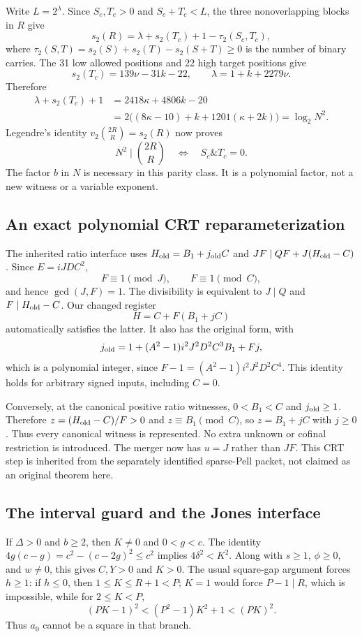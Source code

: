 Write $L=2^\lambda$. Since $S_c,T_c>0$ and $S_c+T_c<L$, the three
nonoverlapping blocks in $R$ give
\[
 s_2(R)=\lambda+s_2(T_c)+1-\tau_2(S_c,T_c),
\]
where $\tau_2(S,T)=s_2(S)+s_2(T)-s_2(S+T)\ge0$ is the number of binary
carries. The 31 low allowed positions and 22 high target positions give
\[
 s_2(T_c)=139\nu-31k-22,\qquad\lambda=1+k+2279\nu.
\]
Therefore
\begin{align*}
 \lambda+s_2(T_c)+1
 &=2418\kappa+4806k-20\\
 &=2\bigl((8\kappa-10)+k+1201(\kappa+2k)\bigr)=\log_2N^2.
\end{align*}
Legendre's identity $v_2\binom{2R}{R}=s_2(R)$ now proves
\[
 N^2\mid\binom{2R}{R}\quad\Longleftrightarrow\quad
 S_c\mathbin{\&}T_c=0.
\]
The factor $b$ in $N$ is necessary in this parity class. It is a polynomial
factor, not a new witness or a variable exponent.

\subsection{An exact polynomial CRT reparameterization}
The inherited ratio interface uses $H_{\rm old}=B_1+j_{\rm old}C$ and
$JF\mid QF+J(H_{\rm old}-C)$. Since $E=iJDC^2$,
\[
 F\equiv1\pmod J,\qquad F\equiv1\pmod C,
\]
and hence $\gcd(J,F)=1$. The divisibility is equivalent to
$J\mid Q$ and $F\mid H_{\rm old}-C$. Our changed register
\[
 H=C+F(B_1+jC)
\]
automatically satisfies the latter. It also has the original form, with
\[
 j_{\rm old}=1+(A^2-1)i^2J^2D^2C^3B_1+Fj,
\]
which is a polynomial integer, since $F-1=(A^2-1)i^2J^2D^2C^4$.
This identity holds for arbitrary signed inputs, including $C=0$.

Conversely, at the canonical positive ratio witnesses, $0<B_1<C$ and
$j_{\rm old}\ge1$. Therefore $z=(H_{\rm old}-C)/F>0$ and
$z\equiv B_1\pmod C$, so $z=B_1+jC$ with $j\ge0$. Thus every
canonical witness is represented. No extra unknown or cofinal restriction is
introduced. The merger now has $u=J$ rather than $JF$. This CRT step is
inherited from the separately identified sparse-Pell packet, not claimed as
an original theorem here.

\subsection{The interval guard and the Jones interface}
If $\Delta>0$ and $b\ge2$, then $K\ne0$ and
$0<g<c$. The identity $4g(c-g)=c^2-(c-2g)^2\le c^2$ implies
$4\delta^2<K^2$. Along with $s\ge1$, $\phi\ge0$, and $w\ne0$, this gives
$C,Y>0$ and $K>0$. The usual square-gap argument forces $h\ge1$:
if $h\le0$, then $1\le K\le R+1<P$; $K=1$ would force $P-1\mid R$,
which is impossible, while for $2\le K<P$,
\[
 (PK-1)^2<(P^2-1)K^2+1<(PK)^2.
\]
Thus $a_0$ cannot be a square in that branch.

